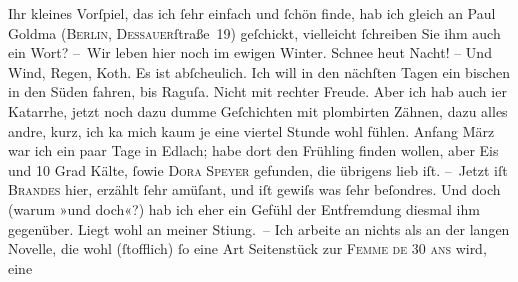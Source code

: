 \begin{ledgroupsized}[t]{13cm}
           \pstart
           Ihr kleines Vorſpiel, das ich
               ſehr einfach und ſchön finde, hab ich gleich an Paul
                     Goldma{\geminationn} (\textsc{Berlin}, \textsc{Dessauer}ſtraße 19) geſchickt, vielleicht ſchreiben
               Sie ihm auch ein Wort? \pend
           \pstart
           – Wir leben hier noch im ewigen {\pb}Winter. Schnee heut
               Nacht! – Und Wind, Regen, Koth. Es ist abſcheulich. Ich will in den nächſten Tagen
               ein bischen in den Süden fahren, bis Raguſa. Nicht
               mit rechter Freude. Aber ich hab auch i{\geminationm}er Katarrhe,
               jetzt noch dazu dumme Geſchichten mit plombirten Zähnen, dazu alles andre, kurz, ich
                  ka{\geminationn}{ }{\pb}mich kaum je eine viertel Stunde wohl fühlen.
                  Anfang März war ich ein paar Tage in Edlach; habe dort den Frühling finden wollen, aber Eis und 10 Grad Kälte,
               ſowie \textsc{Dora Speyer} gefunden, die übrigens lieb iſt.\pend
           \pstart
           – Jetzt iſt \textsc{Brandes} hier, erzählt ſehr amüſant, und iſt gewiſs was ſehr beſondres. Und {\pb}doch (warum »und doch«?) hab ich eher ein Gefühl der
               Entfremdung diesmal ihm gegenüber. Liegt wohl an meiner Sti{\geminationm}ung. –\pend
           \pstart
           Ich arbeite an nichts als an der langen Novelle, die wohl (ſtofflich) ſo eine Art Seitenstück zur
                  \textsc{Femme de 30 ans} wird, eine \label{K_L01024_2v}\label{K_L01024_2h}

\end{ledgroupsized}
